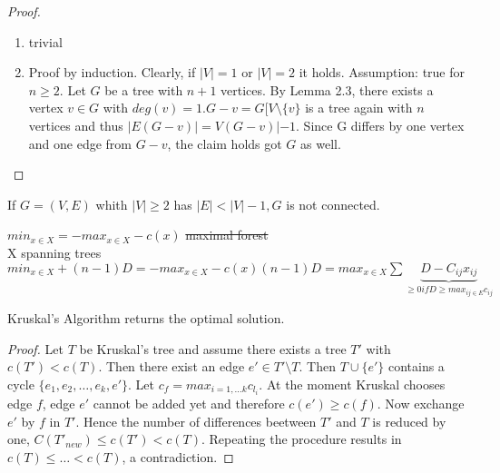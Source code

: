 \begin{proof}



	\begin{enumerate}
		\item trivial
		\item Proof by induction. Clearly, if $|V|=1$ or $|V|=2$ it holds. Assumption: true for $n \geq 2.$
		Let $G$ be a tree with $n+1$ vertices. By Lemma 2.3, there exists a vertex $v \in G$ with $deg(v)=1. G-v=G[V\setminus \{v\}$ is a tree again with $n$ vertices and thus $|E(G-v)|=V(G-v)|-1$. Since G differs by one vertex and one edge from $G-v$, the claim holds got $G$ as well.
	\end{enumerate}
\end{proof}


\begin{lem}
If $G=(V,E)$ whith $|V| \geq 2$ has $|E|< |V|-1, G$ is not connected.
\end{lem}

$min_{x \in X} = -max_{x \in X} -c(x)$ \sout{maximal forest}\\
X spanning trees\\
$min_{x \in X} + (n-1)D= -max_{x \in X} -c(x) (n-1)D =max_{x\in X} \sum \underbrace{D-C_{ij}x_{ij}}_{\geq 0 if D \geq max_{ij \in E} c_{ij}}$

\begin{thm}
Kruskal's Algorithm returns the optimal solution.
\end{thm}
\begin{proof}
Let $T$ be Kruskal's tree and assume there exists a tree $T'$ with $c(T') < c(T)$. Then there exist an edge $e' \in T'\setminus T$. Then $T \cup \{e'\} $ contains a cycle $\{e_1, e_2, \hdots, e_k, e'\}$. Let $ c_f=max_{i=1, \hdots k}c_{l_i} $. 
At the moment Kruskal chooses edge $f$, edge $e'$ cannot be added yet and therefore $c(e')\geq c(f)$. Now exchange $e'$ by $f$ in $T'$. Hence the number of differences beetween $T'$ and $T$ is reduced by one, $C(T'_{new})\leq c(T') < c(T)$. Repeating the procedure results in $c(T) \leq \hdots < c(T)$, a contradiction.
\end{proof}
